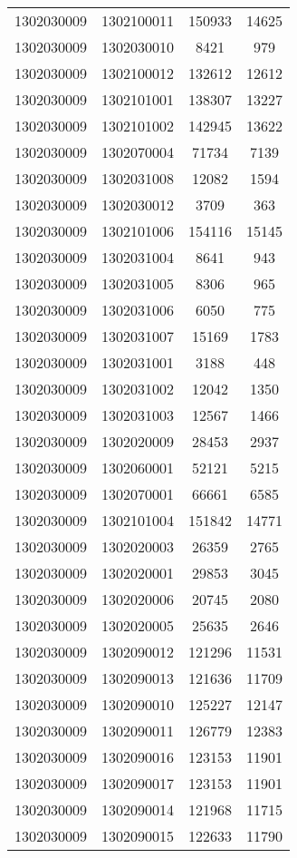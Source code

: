 \begin{longtable}{llcc}
1302030009 & 1302100011 & 150933 & 14625\\
1302030009 & 1302030010 & 8421 & 979\\
1302030009 & 1302100012 & 132612 & 12612\\
1302030009 & 1302101001 & 138307 & 13227\\
1302030009 & 1302101002 & 142945 & 13622\\
1302030009 & 1302070004 & 71734 & 7139\\
1302030009 & 1302031008 & 12082 & 1594\\
1302030009 & 1302030012 & 3709 & 363\\
1302030009 & 1302101006 & 154116 & 15145\\
1302030009 & 1302031004 & 8641 & 943\\
1302030009 & 1302031005 & 8306 & 965\\
1302030009 & 1302031006 & 6050 & 775\\
1302030009 & 1302031007 & 15169 & 1783\\
1302030009 & 1302031001 & 3188 & 448\\
1302030009 & 1302031002 & 12042 & 1350\\
1302030009 & 1302031003 & 12567 & 1466\\
1302030009 & 1302020009 & 28453 & 2937\\
1302030009 & 1302060001 & 52121 & 5215\\
1302030009 & 1302070001 & 66661 & 6585\\
1302030009 & 1302101004 & 151842 & 14771\\
1302030009 & 1302020003 & 26359 & 2765\\
1302030009 & 1302020001 & 29853 & 3045\\
1302030009 & 1302020006 & 20745 & 2080\\
1302030009 & 1302020005 & 25635 & 2646\\
1302030009 & 1302090012 & 121296 & 11531\\
1302030009 & 1302090013 & 121636 & 11709\\
1302030009 & 1302090010 & 125227 & 12147\\
1302030009 & 1302090011 & 126779 & 12383\\
1302030009 & 1302090016 & 123153 & 11901\\
1302030009 & 1302090017 & 123153 & 11901\\
1302030009 & 1302090014 & 121968 & 11715\\
1302030009 & 1302090015 & 122633 & 11790\\

\end{longtable}
